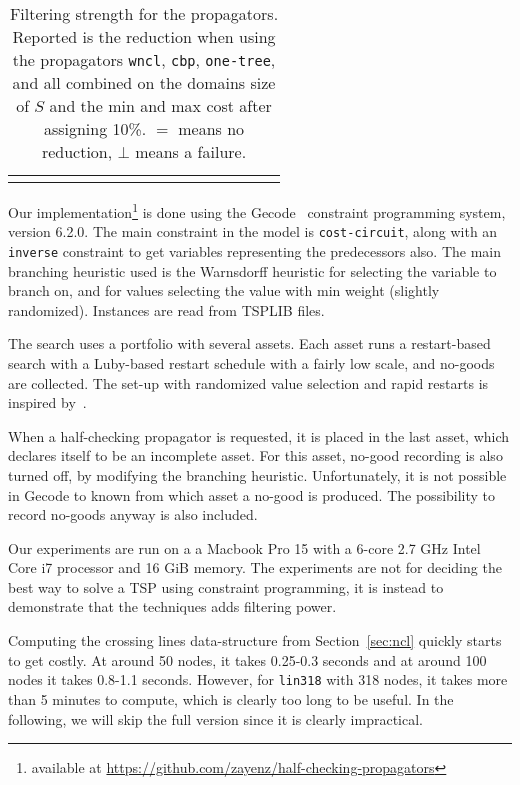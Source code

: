 \documentclass[runningheads]{llncs}
\newcommand{\cons}[1]{\texttt{#1}}
\begin{document}
\begin{sidewaystable}
\begin{tabular}{l p{0.2cm}p{\cw}p{\cw}p{\cw} cp{\cw}p{\cw}p{\cw} cp{\cw}p{\cw}p{\cw} cp{\cw}p{\cw}p{\cw}}
    \bottomrule\\
  \end{tabular}
  \caption{Filtering strength for the propagators. Reported is the
    reduction when using the propagators \cons{wncl}, \cons{cbp},
    \cons{one-tree}, and all combined on the domains size of $S$
    and the min and max cost after assigning 10\%. $=$ means no
    reduction, $\bot$ means a failure.}
  \label{tab:filtering-improvements}
\end{sidewaystable}


Our implementation\footnote{available at \url{https://github.com/zayenz/half-checking-propagators}}
is done using the Gecode~\cite{gecode} constraint programming system,
version 6.2.0. The main
constraint in the model is \cons{cost-circuit}, along with an
\cons{inverse} constraint to get variables representing the
predecessors also. The main branching heuristic used is the
Warnsdorff heuristic for selecting the variable to branch on, and for
values selecting the value with min weight (slightly
randomized). Instances are read from TSPLIB files.

The search uses a portfolio with several assets. Each asset runs a
restart-based search with a Luby-based restart schedule with a fairly
low scale, and no-goods are collected. The set-up with randomized
value selection and rapid restarts is inspired by~\cite{Archibald19}.

When a half-checking propagator is requested, it is placed in the last
asset, which declares itself to be an incomplete asset. For this
asset, no-good recording is also turned off, by modifying the branching
heuristic. Unfortunately, it is not possible in Gecode to known from
which asset a no-good is produced. The possibility to record no-goods
anyway is also included.

Our experiments are run on a a Macbook Pro 15 with a 6-core 2.7 GHz
Intel Core i7 processor and 16 GiB memory. The experiments
are not for deciding the best way to solve a TSP using constraint
programming, it is instead to demonstrate that the techniques adds
filtering power.

Computing the crossing lines data-structure from Section~\ref{sec:ncl}
quickly starts to
get costly. At around 50 nodes, it takes 0.25-0.3 seconds and at
around 100 nodes it takes 0.8-1.1 seconds. However, for
\texttt{lin318} with 318 nodes, it takes more than 5 minutes to
compute, which is clearly too long to be useful. In the following, we
will skip the full version since it is clearly impractical.
\end{document}

